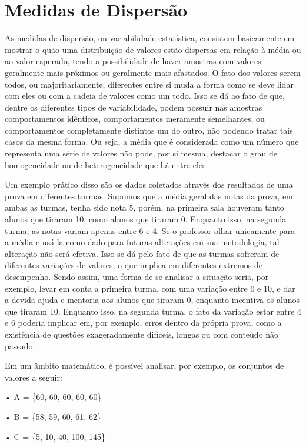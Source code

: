 \section{Medidas de Dispersão}
\label{cap:desenvolvimento}

As medidas de dispersão, ou variabilidade estatística, consistem basicamente em mostrar o quão uma distribuição de valores estão dispersas em relação à média ou ao valor esperado, tendo a possibilidade de haver amostras com valores geralmente mais próximos ou geralmente mais afastados. O fato dos valores serem todos, ou majoritariamente, diferentes entre si muda a forma como se deve lidar com eles ou com a cadeia de valores como um todo. Isso se dá ao fato de que, dentre os diferentes tipos de variabilidade, podem possuir nas amostras comportamentos idênticos, comportamentos meramente semelhantes, ou comportamentos completamente distintos um do outro, não podendo tratar tais casos da mesma forma. Ou seja, a média que é considerada como um número que representa uma série de valores não pode, por si mesma, destacar o grau de homogeneidade ou de heterogeneidade que há entre eles.

Um exemplo prático disso são os dados coletados através dos resultados de uma prova em diferentes turmas. Supomos que a média geral das notas da prova, em ambas as turmas, tenha sido nota 5, porém, na primeira sala houveram tanto alunos que tiraram 10, como alunos que tiraram 0. Enquanto isso, na segunda turma, as notas variam apenas entre 6 e 4. Se o professor olhar unicamente para a média e usá-la como dado para futuras alterações em sua metodologia, tal alteração não será efetiva. Isso se dá pelo fato de que as turmas sofreram de diferentes variações de valores, o que implica em diferentes extremos de desempenho. Sendo assim, uma forma de se analisar a situação seria, por exemplo, levar em conta a primeira turma, com uma variação entre 0 e 10, e dar a devida ajuda e mentoria aos alunos que tiraram 0, enquanto incentiva os alunos que tiraram 10. Enquanto isso, na segunda turma, o fato da variação estar entre 4 e 6 poderia implicar em, por exemplo, erros dentro da própria prova, como a existência de questões exageradamente difíceis, longas ou com conteúdo não passado.

Em um âmbito matemático, é possível analisar, por exemplo, os conjuntos de valores a seguir:

• A = \{60, 60, 60, 60, 60\}

• B = \{58, 59, 60, 61, 62\}

• C = \{5, 10, 40, 100, 145\}

